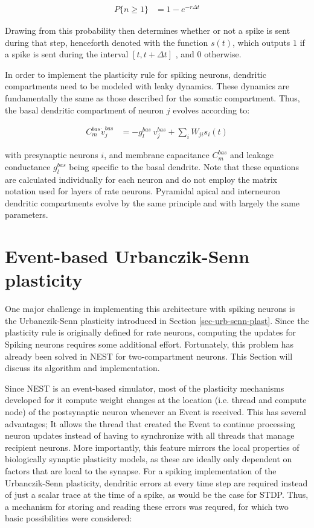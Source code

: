 \begin{align}
  P\{ \textit{n} \geq 1\} & = 1 - e^{-r \Delta t}
\end{align}


Drawing from this probability then determines whether or not a spike is sent during that step, henceforth denoted with
the function $s(t)$, which outputs $1$ if a spike is sent during the interval $[t, t+\Delta t]$ , and $0$ otherwise. \newline

In order to implement the plasticity rule for spiking neurons, dendritic compartments need to be modeled with leaky
dynamics. These dynamics are fundamentally the same as those described for the somatic compartment. Thus, the basal
dendritic compartment of neuron $j$ evolves according to:

\begin{align}
  C_m^{bas} \dot{v}_j^{bas} & = -g_l^{bas} \  v_j^{bas} + \sum_i W_{ji} s_i(t)     \label{eq-spiking-basal-compartment}
\end{align}

with presynaptic neurons $i$, and membrane capacitance $C_m^{bas}$ and leakage conductance $g_l^{bas}$ being specific to
the basal dendrite. Note that these equations are calculated individually for each neuron and do not employ the matrix
notation used for layers of rate neurons. Pyramidal apical and interneuron dendritic compartments evolve by the same
principle and with largely the same parameters.

\section{Event-based Urbanczik-Senn plasticity}\label{sec-event-urb}

One major challenge in implementing this architecture with spiking neurons is the Urbanczik-Senn plasticity introduced
in Section \ref{sec-urb-senn-plast}. Since the plasticity rule is originally defined for rate neurons, computing the
updates for Spiking neurons requires some additional effort. Fortunately, this problem has already been solved in NEST
\citep{Stapmanns2021} for two-compartment neurons. This Section will discuss its algorithm and implementation. \newline

Since NEST is an event-based simulator, most of the plasticity mechanisms developed for it compute weight changes at the
location (i.e. thread and compute node) of the postsynaptic neuron whenever an Event is received. This has several
advantages; It allows the thread that created the Event to continue processing neuron updates instead of having to
synchronize with all threads that manage recipient neurons.  More importantly, this feature mirrors the local properties
of biologically synaptic plasticity models, as these are ideally only dependent on factors that are local to the
synapse. For a spiking implementation of the Urbanczik-Senn plasticity, dendritic errors at every time step are required
instead of just a scalar trace at the time of a spike, as would be the case for STDP. Thus, a mechanism for storing and
reading these errors was requred, for which two basic possibilities were considered:


